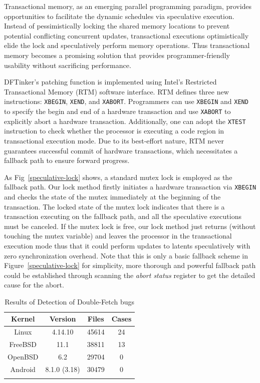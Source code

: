 \documentclass[10pt]{llncs}
\begin{document}
Transactional memory, as an emerging parallel programming paradigm, provides opportunities to facilitate the dynamic schedules via speculative execution. Instead of pessimistically locking the shared memory locations to prevent potential conflicting concurrent updates, transactional executions optimistically elide the lock and speculatively perform memory operations. Thus transactional memory becomes a promising solution that provides programmer-friendly usability without sacrificing performance.

DFTinker's patching function is implemented using Intel's Restricted Transactional Memory (RTM) software interface. RTM defines three new instructions: \verb:XBEGIN:, \verb:XEND:, and \verb:XABORT:. Programmers can use \verb:XBEGIN: and \verb:XEND: to specify the begin and end of a hardware transaction and use \verb:XABORT: to explicitly abort a hardware transaction. Additionally, one can adopt the \verb:XTEST: instruction to check whether the processor is executing a code region in transactional execution mode. Due to its best-effort nature, RTM never guarantees successful commit of hardware transactions, which necessitates a fallback path to ensure forward progress.




As Fig~\ref{speculative-lock} shows, a standard mutex lock is employed as the fallback path. 
Our lock method firstly initiates a hardware transaction via \verb:XBEGIN: and checks the state of the mutex immediately at the beginning of the transaction. The locked state of the mutex lock indicates that there is a transaction executing on the fallback path, and all the speculative executions must be canceled. 
If the mutex lock is free, our lock method just returns (without touching the mutex variable) and leaves the processor in the transactional execution mode thus that it could perform updates to latents speculatively with zero synchronization overhead. 
Note that this is only a basic fallback scheme in Figure~\ref{speculative-lock} for simplicity, 
more thorough and powerful fallback path could be established through scanning the \textit{abort status} register to get the detailed cause for the abort. 

\begin{table}[t]
  \centering
  \caption{Results of Detection of Double-Fetch bugs}
  \begin{tabular}{cccc}
    \hline
    Kernel & Version & Files & Cases \\   
    \hline
    Linux & 4.14.10 & 45614 & 24 \\
    FreeBSD & 11.1 & 38811 & 13 \\
    OpenBSD & 6.2 & 29704 & 0 \\
    Android & 8.1.0 (3.18) & 30479 & 0 \\
    \hline
    \label{stat}
  \end{tabular}
\end{table}
\end{document}
